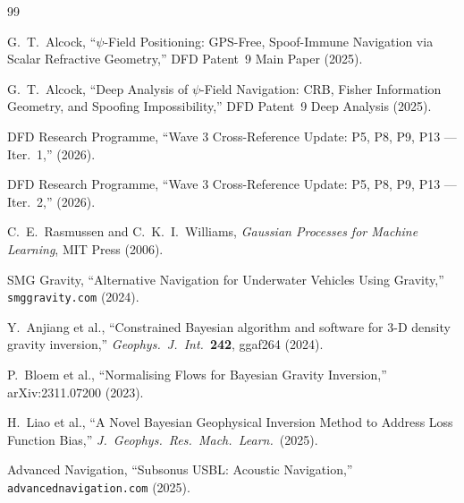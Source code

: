 \documentclass[aps,prd,twocolumn,superscriptaddress,nofootinbib]{revtex4-2}
\begin{document}
\begin{thebibliography}{99}

G.~T.~Alcock,
``$\psi$-Field Positioning: GPS-Free, Spoof-Immune Navigation via Scalar Refractive Geometry,''
DFD Patent~9 Main Paper (2025).

G.~T.~Alcock,
``Deep Analysis of $\psi$-Field Navigation: CRB, Fisher Information Geometry, and Spoofing Impossibility,''
DFD Patent~9 Deep Analysis (2025).

DFD Research Programme,
``Wave 3 Cross-Reference Update: P5, P8, P9, P13 --- Iter.\ 1,''
(2026).

DFD Research Programme,
``Wave 3 Cross-Reference Update: P5, P8, P9, P13 --- Iter.\ 2,''
(2026).

C.~E.~Rasmussen and C.~K.~I.~Williams,
\emph{Gaussian Processes for Machine Learning},
MIT Press (2006).

SMG Gravity,
``Alternative Navigation for Underwater Vehicles Using Gravity,''
\texttt{smggravity.com} (2024).

Y.~Anjiang et al.,
``Constrained Bayesian algorithm and software for 3-D density gravity inversion,''
\emph{Geophys.\ J.\ Int.}\ \textbf{242}, ggaf264 (2024).

P.~Bloem et al.,
``Normalising Flows for Bayesian Gravity Inversion,''
arXiv:2311.07200 (2023).

H.~Liao et al.,
``A Novel Bayesian Geophysical Inversion Method to Address Loss Function Bias,''
\emph{J.\ Geophys.\ Res.\ Mach.\ Learn.}\ (2025).

Advanced Navigation,
``Subsonus USBL: Acoustic Navigation,''
\texttt{advancednavigation.com} (2025).

\end{thebibliography}
\end{document}
